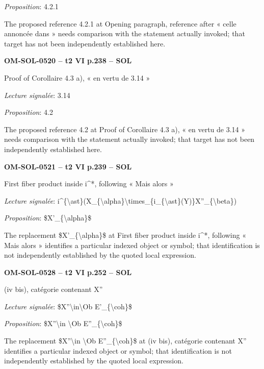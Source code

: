 \emph{Proposition}: 4.2.1\par
The proposed reference 4.2.1 at Opening paragraph, reference after « celle annoncée dans » needs comparison with the statement actually invoked; that target has not been independently established here.\par
\par\noindent\textbf{OM-SOL-0520 -- t2 VI p.238 -- SOL}\par
Proof of Corollaire 4.3 a), « en vertu de 3.14 »\par
\emph{Lecture signalée}: 3.14\par
\emph{Proposition}: 4.2\par
The proposed reference 4.2 at Proof of Corollaire 4.3 a), « en vertu de 3.14 » needs comparison with the statement actually invoked; that target has not been independently established here.\par
\par\noindent\textbf{OM-SOL-0521 -- t2 VI p.239 -- SOL}\par
First fiber product inside i\textasciicircum{}*, following « Mais alors »\par
\emph{Lecture signalée}: i\textasciicircum{}\{\textbackslash{}ast\}(X\_\{\textbackslash{}alpha\}\textbackslash{}times\_\{i\_\{\textbackslash{}ast\}(Y)\}X''\_\{\textbackslash{}beta\})\par
\emph{Proposition}: \$X'\_\{\textbackslash{}alpha\}\$\par
The replacement \$X'\_\{\textbackslash{}alpha\}\$ at First fiber product inside i\textasciicircum{}*, following « Mais alors » identifies a particular indexed object or symbol; that identification is not independently established by the quoted local expression.\par
\par\noindent\textbf{OM-SOL-0528 -- t2 VI p.252 -- SOL}\par
(iv bis), catégorie contenant X''\par
\emph{Lecture signalée}: \$X''\textbackslash{}in\textbackslash{}Ob E'\_\{\textbackslash{}coh\}\$\par
\emph{Proposition}: \$X''\textbackslash{}in \textbackslash{}Ob E''\_\{\textbackslash{}coh\}\$\par
The replacement \$X''\textbackslash{}in \textbackslash{}Ob E''\_\{\textbackslash{}coh\}\$ at (iv bis), catégorie contenant X'' identifies a particular indexed object or symbol; that identification is not independently established by the quoted local expression.\par
